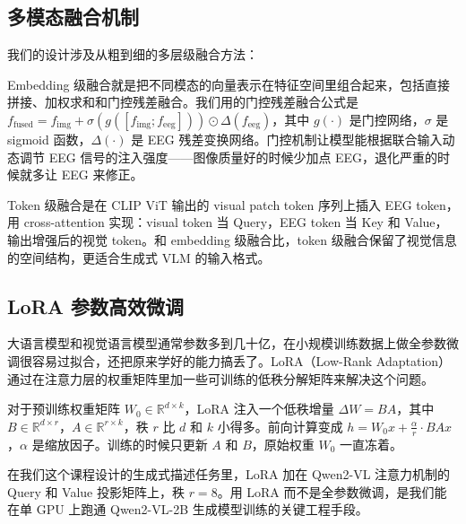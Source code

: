 \subsection{多模态融合机制}

我们的设计涉及从粗到细的多层级融合方法：

Embedding 级融合就是把不同模态的向量表示在特征空间里组合起来，包括直接拼接、加权求和和门控残差融合。我们用的门控残差融合公式是 $f_{\mathrm{fused}} = f_{\mathrm{img}} + \sigma(g([f_{\mathrm{img}}; f_{\mathrm{eeg}}])) \odot \Delta(f_{\mathrm{eeg}})$，其中 $g(\cdot)$ 是门控网络，$\sigma$ 是 sigmoid 函数，$\Delta(\cdot)$ 是 EEG 残差变换网络。门控机制让模型能根据联合输入动态调节 EEG 信号的注入强度——图像质量好的时候少加点 EEG，退化严重的时候就多让 EEG 来修正。

Token 级融合是在 CLIP ViT 输出的 visual patch token 序列上插入 EEG token，用 cross-attention 实现：visual token 当 Query，EEG token 当 Key 和 Value，输出增强后的视觉 token。和 embedding 级融合比，token 级融合保留了视觉信息的空间结构，更适合生成式 VLM 的输入格式。

\subsection{LoRA 参数高效微调}

大语言模型和视觉语言模型通常参数多到几十亿，在小规模训练数据上做全参数微调很容易过拟合，还把原来学好的能力搞丢了。LoRA（Low-Rank Adaptation）通过在注意力层的权重矩阵里加一些可训练的低秩分解矩阵来解决这个问题。

对于预训练权重矩阵 $W_0 \in \mathbb{R}^{d\times k}$，LoRA 注入一个低秩增量 $\Delta W = BA$，其中 $B \in \mathbb{R}^{d\times r}$，$A \in \mathbb{R}^{r\times k}$，秩 $r$ 比 $d$ 和 $k$ 小得多。前向计算变成 $h = W_0 x + \frac{\alpha}{r} \cdot BA x$，$\alpha$ 是缩放因子。训练的时候只更新 $A$ 和 $B$，原始权重 $W_0$ 一直冻着。

在我们这个课程设计的生成式描述任务里，LoRA 加在 Qwen2-VL 注意力机制的 Query 和 Value 投影矩阵上，秩 $r=8$。用 LoRA 而不是全参数微调，是我们能在单 GPU 上跑通 Qwen2-VL-2B 生成模型训练的关键工程手段。
